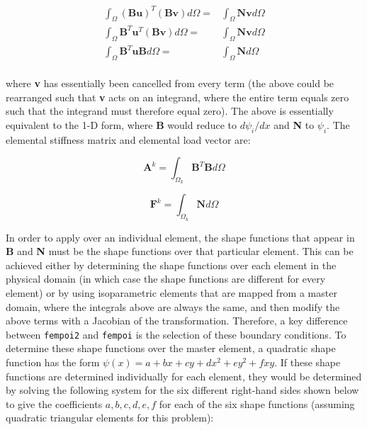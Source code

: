 \documentclass[10pt]{article}
\newcommand{\beq}{\begin{equation}}
\newcommand{\eeq}{\end{equation}}
\newcommand{\beqa}{\begin{equation}\begin{aligned}}
\newcommand{\eeqa}{\end{aligned}\end{equation}}
\begin{document}
\beqa
\int_\Omega (\textbf{B}\textbf{u})^T(\textbf{B}\textbf{v})d\Omega=&\int_\Omega \textbf{N}\textbf{v}d\Omega\\
\int_\Omega \textbf{B}^T\textbf{u}^T(\textbf{B}\textbf{v})d\Omega=&\int_\Omega \textbf{N}\textbf{v}d\Omega\\
\int_\Omega \textbf{B}^T\textbf{u}\textbf{B}d\Omega=&\int_\Omega \textbf{N}d\Omega\\
\eeqa

where \textbf{v} has essentially been cancelled from every term (the above could be rearranged such that \textbf{v} acts on an integrand, where the entire term equals zero such that the integrand must therefore equal zero). The above is essentially equivalent to the 1-D form, where \textbf{B} would reduce to \(d\psi_i/dx\) and \textbf{N} to \(\psi_i\). The elemental stiffness matrix and elemental load vector are:

\beq
\label{eq:20}
\textbf{A}^k=\int_{\Omega_k} \textbf{B}^T\textbf{B}d\Omega
\eeq

\beq
\label{eq:21}
\textbf{F}^k=\int_{\Omega_k} \textbf{N}d\Omega
\eeq

In order to apply over an individual element, the shape functions that appear in \textbf{B} and \textbf{N} must be the shape functions over that particular element. This can be achieved either by determining the shape functions over each element in the physical domain (in which case the shape functions are different for every element) or by using isoparametric elements that are mapped from a master domain, where the integrals above are always the same, and then modify the above terms with a Jacobian of the transformation. Therefore, a key difference between {\tt fempoi2} and {\tt fempoi} is the selection of these boundary conditions. To determine these shape functions over the master element, a quadratic shape function has the form \(\psi(x)=a+bx+cy+dx^2+ey^2+fxy\). If these shape functions are determined individually for each element, they would be determined by solving the following system for the six different right-hand sides shown below to give the coefficients \(a, b, c, d, e, f\) for each of the six shape functions (assuming quadratic triangular elements for this problem):
\end{document}
